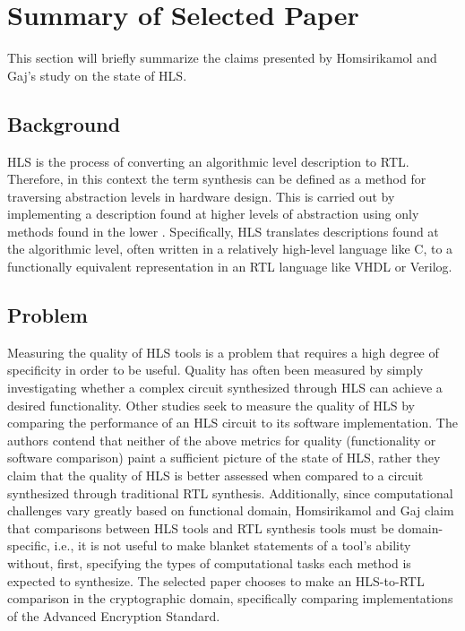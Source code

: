 \documentclass[twocolumn]{article}
\begin{document}
\section{Summary of Selected Paper}

This section will briefly summarize the claims presented by Homsirikamol and Gaj's study on the state of HLS.

\subsection{Background}

HLS is the process of converting an algorithmic level description to RTL. Therefore, in this context the term synthesis can be defined as a method for traversing abstraction levels in hardware design. This is carried out by implementing a description found at higher levels of abstraction using only methods found in the lower \cite{churtl}. Specifically, HLS translates descriptions found at the algorithmic level, often written in a relatively high-level language like C, to a functionally equivalent representation in an RTL language like VHDL or Verilog.

\subsection{Problem}

Measuring the quality of HLS tools is a problem that requires a high degree of specificity in order to be useful. Quality has often been measured by simply investigating whether a complex circuit synthesized through HLS can achieve a desired functionality\cite{8}\cite{9}\cite{10}\cite{11}\cite{12}. Other studies \cite{3}\cite{4} seek to measure the quality of HLS by comparing the performance of an HLS circuit to its software implementation. The authors contend that neither of the above metrics for quality (functionality or software comparison) paint a sufficient picture of the state of HLS, rather they claim that the quality of HLS is better assessed when compared to a circuit synthesized through traditional RTL synthesis. Additionally, since computational challenges vary greatly based on functional domain, Homsirikamol and Gaj claim that comparisons between HLS tools and RTL synthesis tools must be domain-specific, i.e., it is not useful to make blanket statements of a tool's ability without, first, specifying the types of computational tasks each method is expected to synthesize. The selected paper chooses to make an HLS-to-RTL comparison in the cryptographic domain, specifically comparing implementations of the Advanced Encryption Standard.
\end{document}
